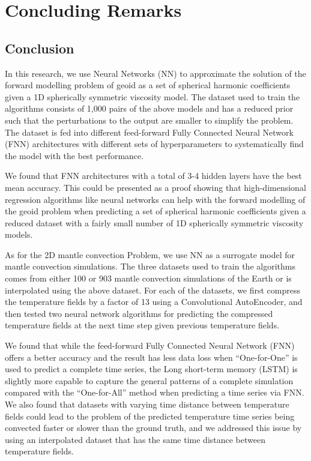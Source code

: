 \chapter{Concluding Remarks}\label{chap:conclusion}

\section{Conclusion}

In this research, we use Neural Networks (NN) to approximate the solution of the forward modelling problem of geoid as a set of spherical harmonic coefficients given a 1D spherically symmetric viscosity model. The dataset used to train the algorithms consists of 1,000 pairs of the above models and has a reduced prior such that the perturbations to the output are smaller to simplify the problem. The dataset is fed into different feed-forward Fully Connected Neural Network (FNN) architectures with different sets of hyperparameters to systematically find the model with the best performance. 

We found that FNN architectures with a total of 3-4 hidden layers have the best mean accuracy. This could be presented as a proof showing that high-dimensional regression algorithms like neural networks can help with the forward modelling of the geoid problem when predicting a set of spherical harmonic coefficients given a reduced dataset with a fairly small number of 1D spherically symmetric viscosity models.

As for the 2D mantle convection Problem, we use NN as a surrogate model for mantle convection simulations. The three datasets used to train the algorithms comes from either 100 or 903 mantle convection simulations of the Earth or is interpolated using the above dataset. For each of the datasets, we first compress the temperature fields by a factor of 13 using a Convolutional AutoEncoder, and then tested two neural network algorithms for predicting the compressed temperature fields at the next time step given previous temperature fields. 

We found that while the feed-forward Fully Connected Neural Network (FNN) offers a better accuracy and the result has less data loss when ``One-for-One'' is used to predict a complete time series, the Long short-term memory (LSTM) is slightly more capable to capture the general patterns of a complete simulation compared with the ``One-for-All'' method when predicting a time series via FNN. We also found that datasets with varying time distance between temperature fields could lead to the problem of the predicted temperature time series being convected faster or slower than the ground truth, and we addressed this issue by using an interpolated dataset that has the same time distance between temperature fields.

